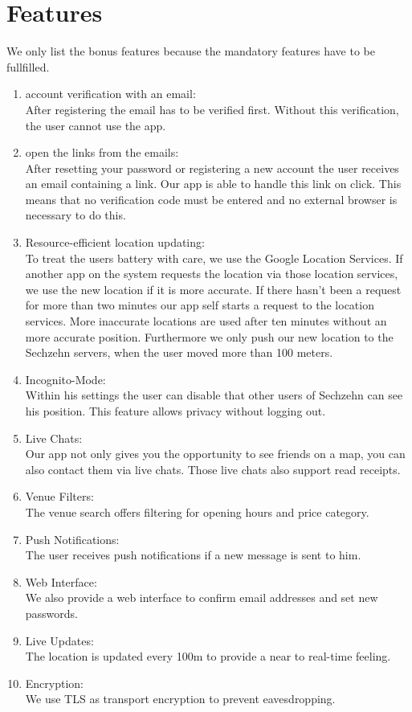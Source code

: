 \documentclass[11pt, accentcolor=tud1c]{tudreport}
\begin{document}
\section{Features}\label{sec:features}
We only list the bonus features because the mandatory features have to be fullfilled.
\begin{enumerate}
\item account verification with an email: \\
After registering the email has to be verified first. Without this verification, the user cannot use the app.
\item open the links from the emails: \\
After resetting your password or registering a new account the user receives an email containing a link. Our app is able to handle this link on click. This means that no verification code must be entered and no external browser is necessary to do this.
\item Resource-efficient location updating: \\
To treat the users battery with care, we use the Google Location Services. If another app on the system requests the location via those location services, we use the new location if it is more accurate. If there hasn't been a request for more than two minutes our app self starts a request to the location services. More inaccurate locations are used after ten minutes without an more accurate position. Furthermore we only push our new location to the Sechzehn servers, when the user moved more than 100 meters. 
\item Incognito-Mode: \\
Within his settings the user can disable that other users of Sechzehn can see his position. This feature allows privacy without logging out.
\item Live Chats: \\
Our app not only gives you the opportunity to see friends on a map, you can also contact them via live chats. Those live chats also support read receipts.
\item Venue Filters: \\
The venue search offers filtering for opening hours and price category.
\item Push Notifications: \\
The user receives push notifications if a new message is sent to him.
\item Web Interface: \\
We also provide a web interface to confirm email addresses and set new passwords.
\item Live Updates: \\
The location is updated every 100m to provide a near to real-time feeling.
\item Encryption: \\
We use TLS as transport encryption to prevent eavesdropping.

\end{enumerate}
\end{document}
